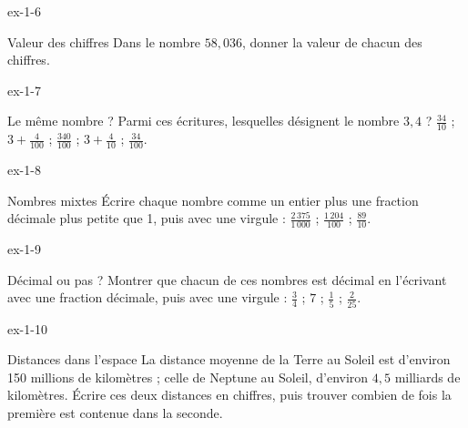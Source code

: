 \begin{blocLivre}{ex-1-6}\begin{exercice}[2]{Valeur des chiffres}
Dans le nombre $58{,}036$, donner la valeur de chacun des chiffres.
\end{exercice}\end{blocLivre}
\begin{blocLivre}{ex-1-7}\begin{exercice}[2]{Le même nombre ?}
Parmi ces écritures, lesquelles désignent le nombre $3{,}4$ ? $\frac{34}{10}$ ; $3+\frac4{100}$ ; $\frac{340}{100}$ ; $3+\frac4{10}$ ; $\frac{34}{100}$.
\end{exercice}\end{blocLivre}
\begin{blocLivre}{ex-1-8}\begin{exercice}[2]{Nombres mixtes}
Écrire chaque nombre comme un entier plus une fraction décimale plus petite que 1, puis avec une virgule : $\frac{2\,375}{1\,000}$ ; $\frac{1\,204}{100}$ ; $\frac{89}{10}$.
\end{exercice}\end{blocLivre}
\begin{blocLivre}{ex-1-9}\begin{exercice}[2]{Décimal ou pas ?}
Montrer que chacun de ces nombres est décimal en l’écrivant avec une fraction décimale, puis avec une virgule : $\frac34$ ; $7$ ; $\frac15$ ; $\frac2{25}$.
\end{exercice}\end{blocLivre}
\begin{blocLivre}{ex-1-10}\begin{exercice}[2]{Distances dans l’espace}
La distance moyenne de la Terre au Soleil est d’environ 150 millions de kilomètres ; celle de Neptune au Soleil, d’environ $4{,}5$ milliards de kilomètres. Écrire ces deux distances en chiffres, puis trouver combien de fois la première est contenue dans la seconde.
\end{exercice}\end{blocLivre}

